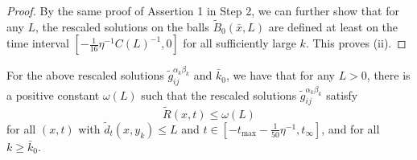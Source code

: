 \begin{proof}
By the same proof of Assertion 1 in Step 2, we can further show
that for any $L$, the rescaled solutions on the balls
$\tilde{B}_{0}(\bar{x},L)$ are defined at least on the time
interval $[-\frac{1}{16}\eta^{-1}C(L)^{-1},0]$ for all
sufficiently large $k$. This proves (ii).

\end{proof}

\begin{lemma}
  \label{lem:cz-extended-limit-uniform-spacetime-curvature}
For the above rescaled solutions
$\widetilde{g}^{\alpha_k\beta_k}_{ij}$ and $\bar{k}_0$, we have
that for any $L>0$, there is a positive constant $\omega(L)$ such
that the rescaled solutions $\widetilde{g}^{\alpha_k\beta_k}_{ij}$
satisfy
$$
\widetilde{R}(x,t)\leq\omega(L)
$$
for all $(x,t)$ with $\tilde{d}_{t}(x,y_k)\leq L$ and $t\in
[-t_{\max}-\frac{1}{50}\eta^{-1},t_{\infty}]$, and for all $k \geq
\bar{k}_0$.

\end{lemma}

